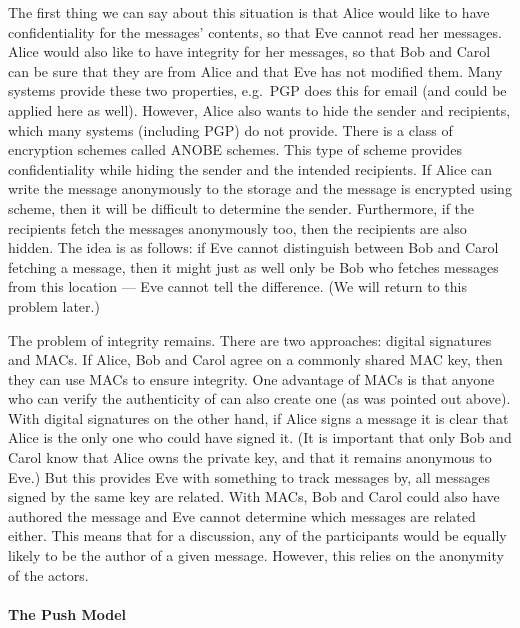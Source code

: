 The first thing we can say about this situation is that Alice would like to 
have confidentiality for the messages' contents, so that Eve cannot read her 
messages.
Alice would also like to have integrity for her messages, so that Bob and Carol 
can be sure that they are from Alice and that Eve has not modified them.
Many systems provide these two properties, e.g.\ \ac{PGP} does this for email 
(and could be applied here as well).
However, Alice also wants to hide the sender and recipients, which many systems 
(including \ac{PGP}) do not provide.
There is a class of encryption schemes called \ac{ANOBE} schemes.
This type of scheme provides confidentiality while hiding the sender and the 
intended recipients.
If Alice can write the message anonymously to the storage and the message is 
encrypted using  scheme, then it will be difficult to determine the 
sender.
Furthermore, if the recipients fetch the messages anonymously too, then the 
recipients are also hidden.
The idea is as follows: if Eve cannot distinguish between Bob and Carol 
fetching a message, then it might just as well only be Bob who fetches messages 
from this location --- Eve cannot tell the difference.
(We will return to this problem later.)

The problem of integrity remains.
There are two approaches: digital signatures and \acp{MAC}.
If Alice, Bob and Carol agree on a commonly shared \ac{MAC} key, then they can 
use \acp{MAC} to ensure integrity.
One advantage of \acp{MAC} is that anyone who can verify the authenticity of 
 can also create one (as was pointed out above).
With digital signatures on the other hand, if Alice signs a message it is clear 
that Alice is the only one who could have signed it.
(It is important that only Bob and Carol know that Alice owns the private key, 
and that it remains anonymous to Eve.)
But this provides Eve with something to track messages by, all messages signed 
by the same key are related.
With \acp{MAC}, Bob and Carol could also have authored the message and Eve 
cannot determine which messages are related either.
This means that for a discussion, any of the participants would be equally 
likely to be the author of a given message.
However, this relies on the anonymity of the actors.

\paragraph{The Push Model}

